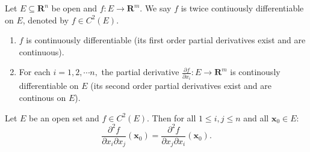 \begin{definition}
    Let $E\subseteq\mathbf{R}^n$ be open and $f:E\to\mathbf{R}^m.$
    We say $f$ is twice contiuously differentiable on $E$, denoted by $f\in C^2(E)$.
    \begin{enumerate}
    \item $f$ is continuously differentiable (its first order partial derivatives exist and are continuous).
    \item For each $i=1,2,\cdots n,$ the partial derivative $\frac{\partial f}{\partial x_i}: E\to\mathbf{R}^m$ is continously differentiable on $E$ (its second order partial derivatives exist and are continous on $E$).
\end{enumerate}
\end{definition}


\begin{theorem}[Clairaut]
Let $E$ be an open set and $f \in C^2(E)$. Then for all $1 \le i, j \le n$ and all $\mathbf{x}_0 \in E$:
$$\frac{\partial^2 f}{\partial x_i \partial x_j}(\mathbf{x}_0) = \frac{\partial^2 f}{\partial x_j \partial x_i}(\mathbf{x}_0).$$
\end{theorem}

